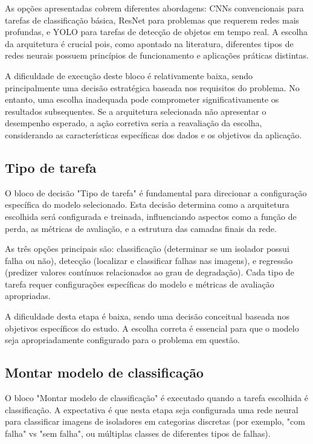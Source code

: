 As opções apresentadas cobrem diferentes abordagens: CNNs convencionais para tarefas de classificação básica, ResNet para problemas que requerem redes mais profundas, e YOLO para tarefas de detecção de objetos em tempo real. A escolha da arquitetura é crucial pois, como apontado na literatura, diferentes tipos de redes neurais possuem princípios de funcionamento e aplicações práticas distintas.

A dificuldade de execução deste bloco é relativamente baixa, sendo principalmente uma decisão estratégica baseada nos requisitos do problema. No entanto, uma escolha inadequada pode comprometer significativamente os resultados subsequentes. Se a arquitetura selecionada não apresentar o desempenho esperado, a ação corretiva seria a reavaliação da escolha, considerando as características específicas dos dados e os objetivos da aplicação.

\subsection{Tipo de tarefa}
O bloco de decisão "Tipo de tarefa" é fundamental para direcionar a configuração específica do modelo selecionado. Esta decisão determina como a arquitetura escolhida será configurada e treinada, influenciando aspectos como a função de perda, as métricas de avaliação, e a estrutura das camadas finais da rede.

As três opções principais são: classificação (determinar se um isolador possui falha ou não), detecção (localizar e classificar falhas nas imagens), e regressão (predizer valores contínuos relacionados ao grau de degradação). Cada tipo de tarefa requer configurações específicas do modelo e métricas de avaliação apropriadas.

A dificuldade desta etapa é baixa, sendo uma decisão conceitual baseada nos objetivos específicos do estudo. A escolha correta é essencial para que o modelo seja apropriadamente configurado para o problema em questão.

\subsection{Montar modelo de classificação}
O bloco "Montar modelo de classificação" é executado quando a tarefa escolhida é classificação. A expectativa é que nesta etapa seja configurada uma rede neural para classificar imagens de isoladores em categorias discretas (por exemplo, "com falha" vs "sem falha", ou múltiplas classes de diferentes tipos de falhas).

